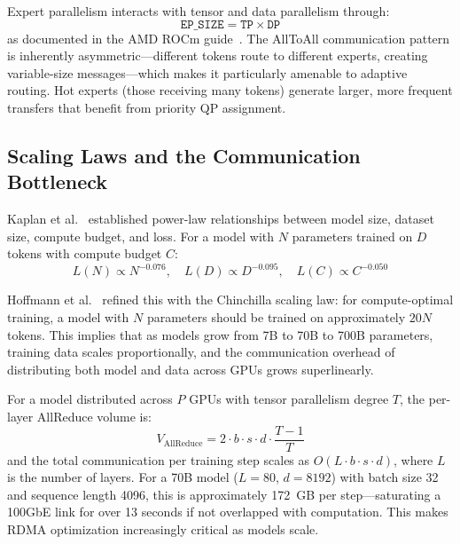 \documentclass[11pt,letterpaper]{article}
\theoremstyle{definition}
\begin{document}
Expert parallelism interacts with tensor and data parallelism through:
\begin{equation}
    \texttt{EP\_SIZE} = \texttt{TP} \times \texttt{DP}
\end{equation}
as documented in the AMD ROCm guide~\cite{amd-moe-guide}. The AllToAll communication pattern is inherently asymmetric---different tokens route to different experts, creating variable-size messages---which makes it particularly amenable to adaptive routing. Hot experts (those receiving many tokens) generate larger, more frequent transfers that benefit from priority QP assignment.

\subsection{Scaling Laws and the Communication Bottleneck}

Kaplan et al.~\cite{kaplan2020scaling} established power-law relationships between model size, dataset size, compute budget, and loss. For a model with $N$ parameters trained on $D$ tokens with compute budget $C$:
\begin{equation}
    L(N) \propto N^{-0.076}, \quad L(D) \propto D^{-0.095}, \quad L(C) \propto C^{-0.050}
\end{equation}

Hoffmann et al.~\cite{hoffmann2022chinchilla} refined this with the Chinchilla scaling law: for compute-optimal training, a model with $N$ parameters should be trained on approximately $20N$ tokens. This implies that as models grow from 7B to 70B to 700B parameters, training data scales proportionally, and the communication overhead of distributing both model and data across GPUs grows superlinearly.

For a model distributed across $P$ GPUs with tensor parallelism degree $T$, the per-layer AllReduce volume is:
\begin{equation}
    V_{\text{AllReduce}} = 2 \cdot b \cdot s \cdot d \cdot \frac{T-1}{T}
\end{equation}
and the total communication per training step scales as $O(L \cdot b \cdot s \cdot d)$, where $L$ is the number of layers. For a 70B model ($L=80$, $d=8192$) with batch size 32 and sequence length 4096, this is approximately 172~GB per step---saturating a 100GbE link for over 13 seconds if not overlapped with computation. This makes RDMA optimization increasingly critical as models scale.

\end{document}
